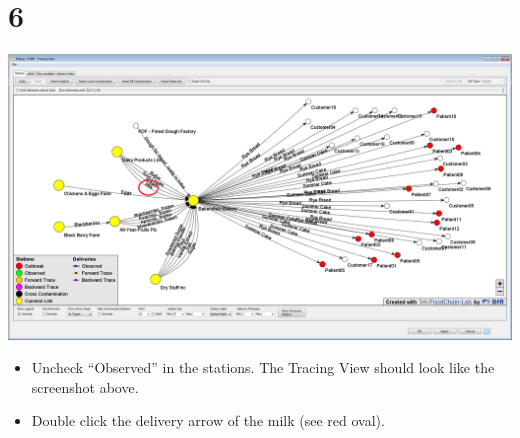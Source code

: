 \documentclass[10pt]{beamer}
\begin{document}
\section{6}
\begin{frame}
	\begin{center}
  		\includegraphics[height=0.6\textheight]{6.png}
	\end{center}
	\begin{itemize}
		\item Uncheck “Observed” in the stations. The Tracing View should look like the screenshot above.
		\item Double click the delivery arrow of the milk (see red oval).
	\end{itemize}
\end{frame}
\end{document}
